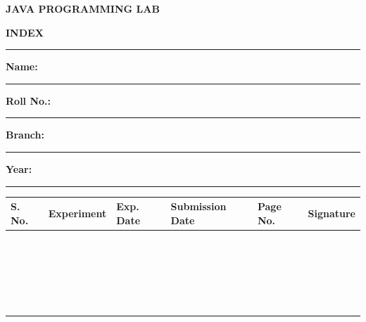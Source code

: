 \documentclass[a4paper,11pt]{article}
\newcommand{\indexheader}{
    \hline
    \rule{0pt}{0.75cm}
    \textbf{S. No.} &
    \centering\textbf{Experiment}\arraybackslash &
    \textbf{Exp. Date} &
    \textbf{Submission Date} &
    \textbf{Page No.} &
    \textbf{Signature}
    \\
    \hline
}
\newcommand{\blankrow}{
    \rule{0pt}{0.72cm} & & & & & \\ \hline
}
\begin{document}

\begin{center}

    {\fontsize{24}{28}\selectfont
    \textbf{JAVA PROGRAMMING LAB}}

    \vspace{0.1cm}

    {\fontsize{17}{20}\selectfont
    \textbf{INDEX}}

\end{center}

\vspace{0.15cm}

\hrule height 1.2pt

\vspace{0.5cm}


\noindent
\begin{minipage}[t]{0.47\textwidth}

    \textbf{Name:}
    \hspace{0.2cm}
    \rule{5.2cm}{0.4pt}

    \vspace{0.7cm}

    \textbf{Roll No.:}
    \hspace{0.2cm}
    \rule{4.55cm}{0.4pt}

\end{minipage}
\hfill
\begin{minipage}[t]{0.43\textwidth}

    \textbf{Branch:}
    \hspace{0.2cm}
    \rule{4.1cm}{0.4pt}

    \vspace{0.7cm}

    \textbf{Year:}
    \hspace{0.2cm}
    \rule{4.55cm}{0.4pt}

\end{minipage}

\vspace{0.5cm}


\begin{tabularx}{\textwidth}{
    |C{0.85cm}
    |L
    |C{1.55cm}
    |C{2.0cm}
    |C{1.25cm}
    |C{1.65cm}|
}

\indexheader

\blankrow
\blankrow
\blankrow
\blankrow
\blankrow

\blankrow
\blankrow
\blankrow
\blankrow
\blankrow

\blankrow
\blankrow
\blankrow
\blankrow
\blankrow

\blankrow
\blankrow
\blankrow
\blankrow
\blankrow

\blankrow
\blankrow
\blankrow

\end{tabularx}
\end{document}
